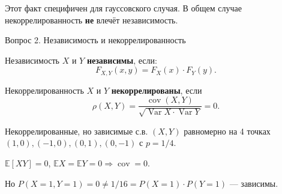\documentclass[12pt, a4paper]{article}
\newcommand{\question}[2]{%
  \newpage%
  \noindent\colorbox{qcolor}{\parbox{\dimexpr\linewidth-2\fboxsep\relax}{%
    \color{white}\large\bfseries\strut Вопрос #1. #2%
  }}%
  \vspace{6pt}%
}
\newcommand{\cov}{\operatorname{cov}}
\newcommand{\Var}{\operatorname{Var}}
\newcommand{\E}{\mathbb{E}}
\begin{document}
\begin{rembox}{}
Этот факт специфичен для гауссовского случая. В общем случае некоррелированность
\textbf{не} влечёт независимость.
\end{rembox}

\question{2}{Независимость и некоррелированность}

\begin{defbox}{Независимость}
$X$ и $Y$ \textbf{независимы}, если:
\[
  F_{X,Y}(x,y) = F_X(x)\cdot F_Y(y).
\]
\end{defbox}

\begin{defbox}{Некоррелированность}
$X$ и $Y$ \textbf{некоррелированы}, если
\[
  \rho(X,Y) = \frac{\cov(X,Y)}{\sqrt{\Var X \cdot \Var Y}} = 0.
\]
\end{defbox}

\begin{exbox}{Некоррелированные, но зависимые с.в.}
$(X,Y)$ равномерно на 4 точках $(1,0),(-1,0),(0,1),(0,-1)$ с $p=1/4$.

$\E[XY] = 0$, $\E X = \E Y = 0 \Rightarrow \cov = 0$.

Но $P(X=1,Y=1) = 0 \neq 1/16 = P(X=1)\cdot P(Y=1)$ --- зависимы.
\end{exbox}
\end{document}
